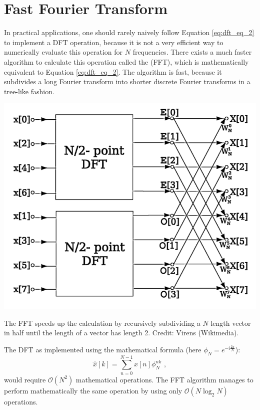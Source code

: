 

\section{Fast Fourier Transform}

In practical applications, one should rarely naively follow Equation
\ref{eq:dft_eq_2} to implement a DFT operation, because it is not a
very efficient way to numerically evaluate this operation for $N$
frequencies. There exists a much faster algorithm to calculate this
operation called the  (FFT), which is mathematically equivalent to Equation
\ref{eq:dft_eq_2}. The algorithm is fast, because it subdivides a long
Fourier transform into shorter discrete Fourier transforms in a
tree-like fashion.

\begin{marginfigure}
\begin{center}
\includegraphics[width=\textwidth]{ch15/figures/butterfly.png}
\end{center}
\caption{The FFT speeds up the calculation by recursively subdividing a $N$ length vector in half until the length of a vector has length 2. Credit: Virens (Wikimedia).}
\end{marginfigure}

The DFT as implemented using the mathematical formula (here $\phi_N
= e^{-i\frac{2\pi}{N}}$):
\begin{equation}
  \hat{x}[k]=\sum_{n=0}^{N-1}x[n]\phi_N^{nk} \,\,,
  \label{eq:dft_eq_2}
\end{equation}
would require $\mathcal{O}(N^2)$ mathematical operations. The FFT
algorithm manages to perform mathematically the same operation by
using only $\mathcal{O}(N\log_2{N})$ operations.

